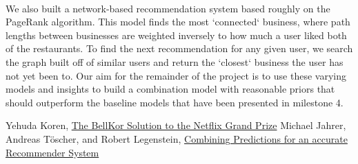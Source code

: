 \documentclass[11pt]{article}
\begin{document}
\paragraph{} We also built a network-based recommendation system based roughly on the PageRank algorithm. This model finds the most `connected` business, where path lengths between businesses are weighted inversely to how much a user liked both of the restaurants. To find the next recommendation for any given user, we search the graph built off of similar users and return the `closest` business the user has not yet been to. Our aim for the remainder of the project is to use these varying models and insights to build a combination model with reasonable priors that should outperform the baseline models that have been presented in milestone 4.

\begin{thebibliography}{9}
  Yehuda Koren,
  \href{http://netflixprize.com/assets/GrandPrize2009_BPC_BellKor.pdf}{The BellKor Solution to the Netflix Grand Prize}
  Michael Jahrer, Andreas Töscher, and Robert Legenstein,
  \href{http://www.igi.tugraz.at/psfiles/JahrerETAL_2010.pdf}{Combining Predictions for an accurate Recommender System}

\end{thebibliography}
\end{document}

